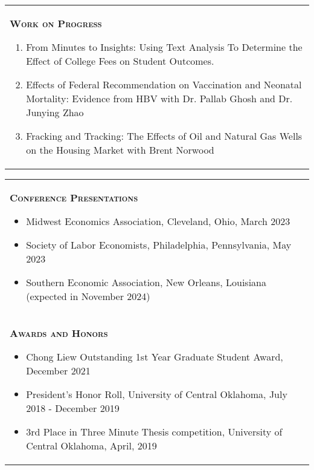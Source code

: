 \documentclass[10pt,letterpaper]{article}
\begin{document}
\begin{tabular}{p{7.5in}}
{\textsc{\textbf{Work on Progress}}}
\begin{enumerate}

\item From Minutes to Insights: Using Text Analysis To Determine the Effect of College Fees on Student Outcomes. 

\item Effects of Federal Recommendation on Vaccination and Neonatal Mortality: Evidence from HBV with Dr. Pallab Ghosh and Dr.  Junying Zhao

\item Fracking and Tracking: The Effects of Oil and Natural Gas Wells on the Housing Market with Brent Norwood
\end{enumerate}







\end{tabular}



\begin{tabular}{p{7.5in}}

	{\large \textsc{\textbf{\large{Conference Presentations}}}}
	\begin{itemize}
    \item Midwest Economics Association,  Cleveland,  Ohio,  March 2023
    \item Society of Labor Economists,  Philadelphia,  Pennsylvania,  May 2023
    \item Southern Economic Association,  New Orleans,  Louisiana (expected in November 2024)
	\end{itemize}
	\\
	
	{\large \textsc{\textbf{\large{Awards and Honors}}}}
	\begin{itemize}
    \item Chong Liew Outstanding 1st Year Graduate Student Award, December 2021
    \item President's Honor Roll, University of Central Oklahoma, July 2018 - December 2019
    \item 3rd Place in Three Minute Thesis competition, University of Central Oklahoma, April, 2019
	\end{itemize}
	\\
\end{tabular}
\end{document}
